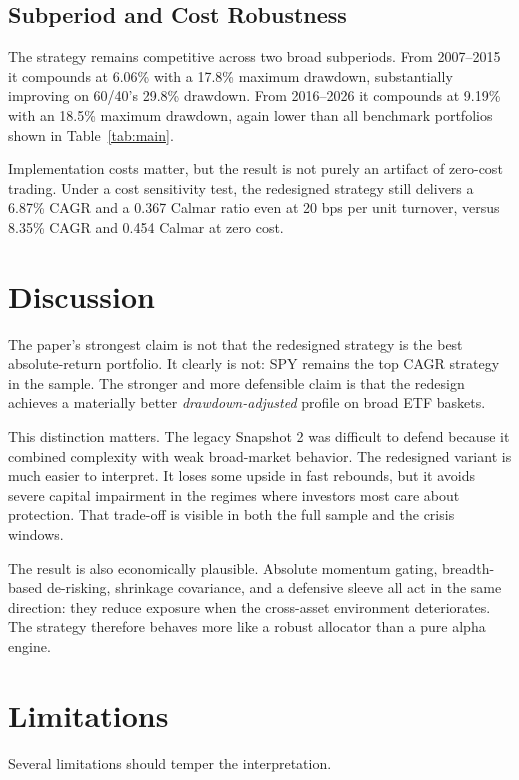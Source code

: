 \documentclass[11pt]{article}
\begin{document}
\subsection{Subperiod and Cost Robustness}

The strategy remains competitive across two broad subperiods. From 2007--2015 it compounds at 6.06\% with a 17.8\% maximum drawdown, substantially improving on 60/40's 29.8\% drawdown. From 2016--2026 it compounds at 9.19\% with an 18.5\% maximum drawdown, again lower than all benchmark portfolios shown in Table~\ref{tab:main}.

Implementation costs matter, but the result is not purely an artifact of zero-cost trading. Under a cost sensitivity test, the redesigned strategy still delivers a 6.87\% CAGR and a 0.367 Calmar ratio even at 20 bps per unit turnover, versus 8.35\% CAGR and 0.454 Calmar at zero cost.

\section{Discussion}

The paper's strongest claim is not that the redesigned strategy is the best absolute-return portfolio. It clearly is not: SPY remains the top CAGR strategy in the sample. The stronger and more defensible claim is that the redesign achieves a materially better \emph{drawdown-adjusted} profile on broad ETF baskets.

This distinction matters. The legacy Snapshot 2 was difficult to defend because it combined complexity with weak broad-market behavior. The redesigned variant is much easier to interpret. It loses some upside in fast rebounds, but it avoids severe capital impairment in the regimes where investors most care about protection. That trade-off is visible in both the full sample and the crisis windows.

The result is also economically plausible. Absolute momentum gating, breadth-based de-risking, shrinkage covariance, and a defensive sleeve all act in the same direction: they reduce exposure when the cross-asset environment deteriorates. The strategy therefore behaves more like a robust allocator than a pure alpha engine.

\section{Limitations}

Several limitations should temper the interpretation.
\end{document}
